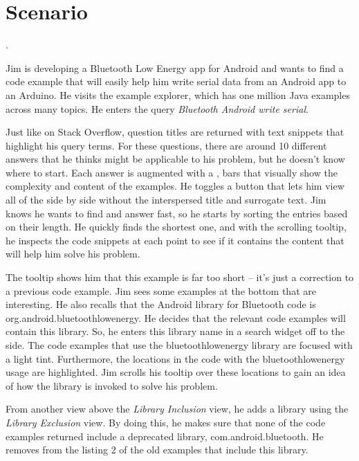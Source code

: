 \section{Scenario}

.

Jim is developing a Bluetooth Low Energy app for Android and wants to find a code example that will easily help him write serial data from an Android app to an Arduino.
He visits the \systemname{} example explorer, which has one million Java examples across many topics.
He enters the query \emph{Bluetooth Android write serial}.

Just like on Stack Overflow, question titles are returned with text snippets that highlight his query terms.
For these questions, there are around 10 different answers that he thinks might be applicable to his problem, but he doesn't know where to start.
Each answer is augmented with a \systemname{}, bars that visually show the complexity and content of the examples.
He toggles a button that lets him view all of the \systemname{} side by side without the interspersed title and surrogate text.
Jim knows he wants to find and answer fast, so he starts by sorting the \systemname{} entries based on their length.
He quickly finds the shortest one, and with the scrolling tooltip, he inspects the code snippets at each point to see if it contains the content that will help him solve his problem.

The tooltip shows him that this example is far too short -- it's just a correction to a previous code example.
Jim sees some examples at the bottom that are interesting.
He also recalls that the Android library for Bluetooth code is org.android.bluetoothlowenergy.
He decides that the relevant code examples will contain this library.
So, he enters this library name in a search widget off to the side.
The code examples that use the bluetoothlowenergy library are focused with a light tint.
Furthermore, the locations in the code with the bluetoothlowenergy usage are highlighted.
Jim scrolls his tooltip over these locations to gain an idea of how the library is invoked to solve his problem.

From another view above the \emph{Library Inclusion} view, he adds a library using the \emph{Library Exclusion} view.
By doing this, he makes sure that none of the code examples returned include a deprecated library, com.android.bluetooth.
He removes from the listing 2 of the old examples that include this library.

